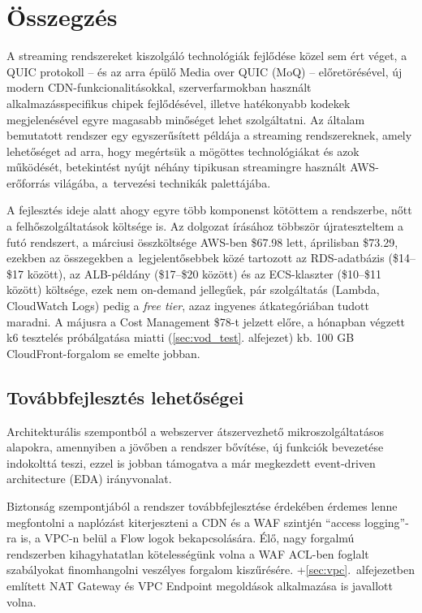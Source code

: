 \chapter{Összegzés}

A streaming rendszereket kiszolgáló technológiák fejlődése közel sem ért véget, a QUIC protokoll -- és az arra épülő Media over QUIC\cite{ietf-moq-transport-11} (MoQ) -- előretörésével, új modern CDN-funkcionalitásokkal, szerverfarmokban használt alkalmazásspecifikus chipek fejlődésével, illetve hatékonyabb kodekek megjelenésével egyre magasabb minőséget lehet szolgáltatni. Az általam bemutatott rendszer egy egyszerűsített példája a streaming rendszereknek, amely lehetőséget ad arra, hogy megértsük a mögöttes technológiákat és azok működését, betekintést nyújt néhány tipikusan streamingre használt AWS-erőforrás világába, a~tervezési technikák palettájába.

A fejlesztés ideje alatt ahogy egyre több komponenst kötöttem a rendszerbe, nőtt a felhőszolgáltatások költsége is. Az dolgozat írásához többször újrateszteltem a futó rendszert, a márciusi összköltsége AWS-ben \$67.98 lett, áprilisban \$73.29, ezekben az összegekben a~legjelentősebbek közé tartozott az RDS-adatbázis (\$14--\$17 között), az ALB-példány (\$17--\$20 között) és az ECS-klaszter (\$10--\$11 között) költsége, ezek nem on-demand jellegűek, pár szolgáltatás (Lambda, CloudWatch Logs) pedig a \emph{free tier}, azaz ingyenes átkategóriában tudott maradni. A májusra a Cost Management \$78-t jelzett előre, a hónapban végzett k6 tesztelés próbálgatása miatti (\ref{sec:vod_test}. alfejezet) kb. 100 GB CloudFront-forgalom se emelte jobban.

\section{Továbbfejlesztés lehetőségei}

Architekturális szempontból a webszerver átszervezhető mikroszolgáltatásos alapokra, amennyiben a jövőben a rendszer bővítése, új funkciók bevezetése indokolttá teszi, ezzel is jobban támogatva a már megkezdett event-driven architecture (EDA)\cite{eda} irányvonalat.

Biztonság szempontjából a rendszer továbbfejlesztése érdekében érdemes lenne megfontolni a naplózást kiterjeszteni a CDN és a WAF szintjén ``access logging''-ra is, a VPC-n belül a Flow logok bekapcsolására. Élő, nagy forgalmú rendszerben kihagyhatatlan kötelességünk volna a WAF ACL-ben foglalt szabályokat finomhangolni veszélyes forgalom kiszűrésére. \Az+\ref{sec:vpc}.~alfejezetben említett NAT Gateway és VPC Endpoint megoldások alkalmazása is javallott volna.

